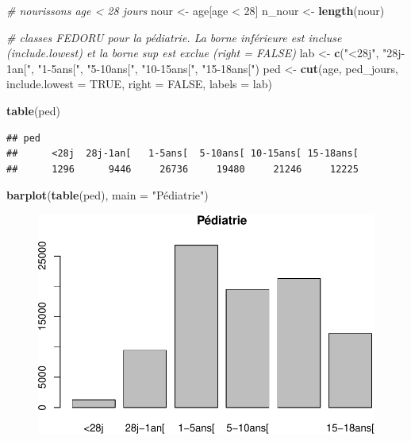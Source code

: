 \documentclass[]{article}
\newenvironment{Shaded}{\begin{snugshade}}{\end{snugshade}}
\newcommand{\KeywordTok}[1]{\textcolor[rgb]{0.13,0.29,0.53}{\textbf{{#1}}}}
\newcommand{\DataTypeTok}[1]{\textcolor[rgb]{0.13,0.29,0.53}{{#1}}}
\newcommand{\DecValTok}[1]{\textcolor[rgb]{0.00,0.00,0.81}{{#1}}}
\newcommand{\StringTok}[1]{\textcolor[rgb]{0.31,0.60,0.02}{{#1}}}
\newcommand{\CommentTok}[1]{\textcolor[rgb]{0.56,0.35,0.01}{\textit{{#1}}}}
\newcommand{\OtherTok}[1]{\textcolor[rgb]{0.56,0.35,0.01}{{#1}}}
\newcommand{\NormalTok}[1]{{#1}}
\begin{document}
\begin{Shaded}
\begin{Highlighting}[]
\CommentTok{# nourissons age < 28 jours}
\NormalTok{nour <-}\StringTok{ }\NormalTok{age[age <}\StringTok{ }\DecValTok{28}\NormalTok{]}
\NormalTok{n_nour <-}\StringTok{ }\KeywordTok{length}\NormalTok{(nour)}

\CommentTok{# classes FEDORU pour la pédiatrie. La borne inférieure est incluse (include.lowest) et la borne sup est exclue (right = FALSE)}
\NormalTok{lab <-}\StringTok{ }\KeywordTok{c}\NormalTok{(}\StringTok{"<28j"}\NormalTok{, }\StringTok{"28j-1an["}\NormalTok{, }\StringTok{"1-5ans["}\NormalTok{, }\StringTok{"5-10ans["}\NormalTok{, }\StringTok{"10-15ans["}\NormalTok{, }\StringTok{"15-18ans["}\NormalTok{)}
\NormalTok{ped <-}\StringTok{ }\KeywordTok{cut}\NormalTok{(age, ped_jours, }\DataTypeTok{include.lowest =} \OtherTok{TRUE}\NormalTok{, }\DataTypeTok{right =} \OtherTok{FALSE}\NormalTok{, }\DataTypeTok{labels =} \NormalTok{lab)}

\KeywordTok{table}\NormalTok{(ped)}
\end{Highlighting}
\end{Shaded}

\begin{verbatim}
## ped
##      <28j  28j-1an[   1-5ans[  5-10ans[ 10-15ans[ 15-18ans[ 
##      1296      9446     26736     19480     21246     12225
\end{verbatim}

\begin{Shaded}
\begin{Highlighting}[]
\KeywordTok{barplot}\NormalTok{(}\KeywordTok{table}\NormalTok{(ped), }\DataTypeTok{main =} \StringTok{"Pédiatrie"}\NormalTok{)}
\end{Highlighting}
\end{Shaded}

\begin{figure}[htbp]
\centering
\includegraphics{./age_files/figure-latex/ped-3.pdf}
\end{figure}
\end{document}
